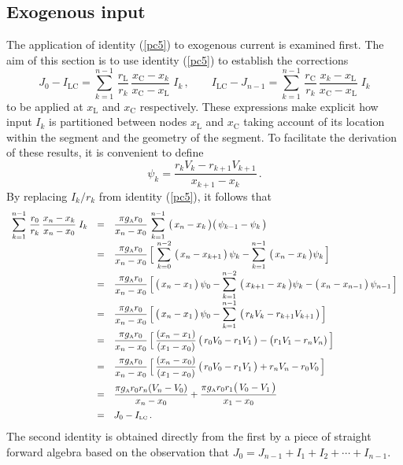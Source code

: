 \subsection{Exogenous input}
The application of identity (\ref{pc5}) to exogenous current is
examined first. The aim of this section is to use identity
(\ref{pc5}) to establish the corrections
\begin{equation}\label{ei1}
J_0-I_\mathrm{LC}=\sum_{k=1}^{n-1}\,\frac{r_\mathrm{L}}{r_k}\,
\frac{x_\mathrm{C}-x_k}{x_\mathrm{C}-x_\mathrm{L}}\;I_k\,,\qquad
I_\mathrm{LC}-J_{n-1}=\sum_{k=1}^{n-1}\,\frac{r_\mathrm{C}}{r_k}\,
\frac{x_k-x_\mathrm{L}}{x_\mathrm{C}-x_\mathrm{L}}\;I_k
\end{equation}
to be applied at $x_\mathrm{L}$ and $x_\mathrm{C}$ respectively.
These expressions make explicit how input $I_k$ is partitioned
between nodes $x_\mathrm{L}$ and $x_\mathrm{C}$ taking account of
its location within the segment and the geometry of the segment.
To facilitate the derivation of these results, it is convenient to
define
\begin{equation}\label{ei2}
\psi_k=\frac{r_k V_k- r_{k+1}V_{k+1}}{x_{k+1}-x_k}\,.
\end{equation}
By replacing $I_k/r_k$ from identity (\ref{pc5}), it follows that
\[
\begin{array}{rcl}
\displaystyle\sum_{k=1}^{n-1}\,\frac{r_0}{r_k}\,
\frac{x_n-x_k}{x_n-x_0}\;I_k & = & \displaystyle\frac{\pi g_{\mbox{\tiny A}} r_0}
{x_n-x_0}\,\sum_{k=1}^{n-1}\,\big(\,x_n-x_k\,\big)
\big(\,\psi_{k-1}-\psi_k\,\big)\\[10pt]
& = & \displaystyle\frac{\pi g_{\mbox{\tiny A}} r_0}{x_n-x_0}\,\Big[\,
\sum_{k=0}^{n-2}\,\big(\,x_n-x_{k+1}\,\big)\,\psi_k
-\sum_{k=1}^{n-1}\,\big(\,x_n-x_k\,\big)\psi_k\,\Big]\\[10pt]
& = & \displaystyle\frac{\pi g_{\mbox{\tiny A}} r_0}{x_n-x_0}\,\Big[\,
\big(\,x_n-x_1\,\big)\,\psi_0-\sum_{k=1}^{n-2}\,
\big(\,x_{k+1}-x_k\,\big)\psi_k-\big(\,x_n-x_{n-1}\,\big)\,
\psi_{n-1}\,\Big]\\[10pt]
& = & \displaystyle\frac{\pi g_{\mbox{\tiny A}} r_0}{x_n-x_0}\,\Big[\,
\big(\,x_n-x_1\,\big)\,\psi_0-\sum_{k=1}^{n-1}\,
\big(\,r_k V_k-r_{k+1}V_{k+1}\,\big)\,\Big]\\[10pt]
& = & \displaystyle\frac{\pi g_{\mbox{\tiny A}} r_0}{x_n-x_0}\,\Big[\,
\frac{(x_n-x_1)}{(x_1-x_0)}\,\big(\,r_0 V_0-r_1 V_1\,\big)
-\big(r_1 V_1-r_n V_n\big)\,\Big]\\[10pt]
& = & \displaystyle\frac{\pi g_{\mbox{\tiny A}} r_0}{x_n-x_0}\,\Big[\,
\frac{(x_n-x_0)}{(x_1-x_0)}\,\big(\,r_0 V_0-r_1 V_1\,\big)
+r_n V_n-r_0 V_0\,\Big]\\[10pt]
& = & \displaystyle\frac{\pi g_{\mbox{\tiny A}} r_0 r_n (V_n-V_0)}{x_n-x_0}
+\frac{\pi g_{\mbox{\tiny A}} r_0 r_1\big(\,V_0-V_1\,\big)}
{x_1-x_0}\\[10pt]
& = & J_0-I_{\mbox{\tiny LC}}\,.
\end{array}
\]
The second identity is obtained directly from the first by a piece
of straight forward algebra based on the observation that
$J_0=J_{n-1}+I_1+I_2+\cdots+I_{n-1}$.

